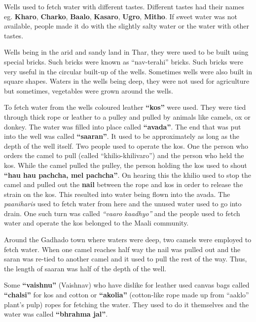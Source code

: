 Wells used to fetch water with different tastes. Different tastes had their names eg. \textbf{Kharo}, \textbf{Charko}, \textbf{Baalo}, \textbf{Kasaro}, \textbf{Ugro}, \textbf{Mitho}. If sweet water was not available, people made it do with the slightly salty water or the water with other tastes.

Wells being in the arid and sandy land in Thar, they were used to be built using special bricks. Such bricks were known as ``nav-terahi'' bricks. Such bricks were very useful in the circular built-up of the wells. Sometimes wells were also built in square shapes. Waters in the wells being deep, they were not used for agriculture but sometimes, vegetables were grown around the wells.

To fetch water from the wells coloured leather \textbf{``kos''} were used. They were tied through thick rope or leather to a pulley and pulled by animals like camels, ox or donkey. The water was filled into place called \textbf{``avada''}. The end that was put into the well was called \textbf{``saaran''}. It used to be approximately as long as the depth of the well itself. Two people used to operate the kos. One the person who orders the camel to pull (called ``khilio-khilivaro'') and the person who held the kos. While the camel pulled the pulley, the person holding the kos used to shout \textbf{``hau hau pachcha, mel pachcha''}. On hearing this the khilio used to stop the camel and pulled out the \textbf{nail} between the rope and kos in order to release the strain on the kos. This resulted into water being flown into the avada. The \textit{paaniharis} used to fetch water from here and the unused water used to go into drain. One such turn was called \textit{``vaaro kaadhyo''} and the people used to fetch water and operate the kos belonged to the Maali community.

Around the Gadhado town where waters were deep, two camels were employed to fetch water. When one camel reaches half way the nail was pulled out and the saran was re-tied to another camel and it used to pull the rest of the way. Thus, the length of saaran was half of the depth of the well.

Some \textbf{``vaishnu''} (Vaishnav) who have dislike for leather used canvas bags called \textbf{``chalsi''} for kos and cotton or \textbf{``akolia''} (cotton-like rope made up from ``aaklo'' plant's pulp) ropes for fetching the water. They used to do it themselves and the water was called \textbf{``bhrahma jal''}.

